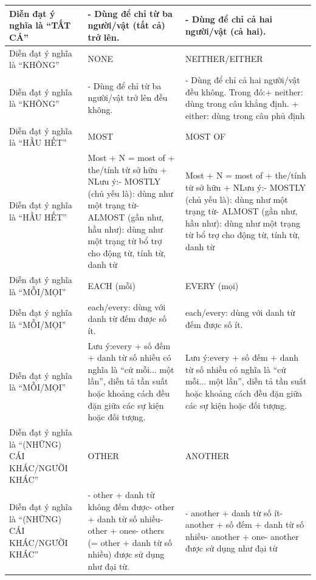 \documentclass[12pt,a4paper,twoside]{article}
\begin{document}
{\begin{longtable}{|>{\raggedright\arraybackslash}p{}|>{\raggedright\arraybackslash}p{}|>{\raggedright\arraybackslash}p{}|}
\hline
Diễn đạt ý nghĩa là “TẤT CẢ” & - Dùng để chỉ từ ba người/vật (tất cả) trở lên. & - Dùng để chỉ cả hai người/vật (cả hai). \\
\hline
Diễn đạt ý nghĩa là “KHÔNG” & NONE & NEITHER/EITHER \\
\hline
Diễn đạt ý nghĩa là “KHÔNG” & - Dùng để chỉ từ ba người/vật trở lên đều không. & - Dùng để chỉ cả hai người/vật đều không. Trong đó:\newline + neither: dùng trong câu khẳng định. + either: dùng trong câu phủ định \\
\hline
Diễn đạt ý nghĩa là “HẦU HẾT” & MOST & MOST OF \\
\hline
Diễn đạt ý nghĩa là “HẦU HẾT” & Most + N = most of + the/tính từ sở hữu + N\newline  Lưu ý:\newline - MOSTLY (chủ yếu là): dùng như một trạng từ\newline - ALMOST (gần như, hầu như): dùng như một trạng từ bổ trợ cho động từ, tính từ, danh từ & Most + N = most of + the/tính từ sở hữu + N\newline  Lưu ý:\newline - MOSTLY (chủ yếu là): dùng như một trạng từ\newline - ALMOST (gần như, hầu như): dùng như một trạng từ bổ trợ cho động từ, tính từ, danh từ \\
\hline
Diễn đạt ý nghĩa là “MỖI/MỌI” & EACH (mỗi) & EVERY (mọi) \\
\hline
Diễn đạt ý nghĩa là “MỖI/MỌI” & each/every: dùng với danh từ đếm được số ít. & each/every: dùng với danh từ đếm được số ít. \\
\hline
Diễn đạt ý nghĩa là “MỖI/MỌI” & Lưu ý:\newline every + số đếm + danh từ số nhiều có nghĩa là “cứ mỗi... một lần”, diễn tả tần suất hoặc khoảng cách đều đặn giữa các sự kiện hoặc đối tượng. & Lưu ý:\newline every + số đếm + danh từ số nhiều có nghĩa là “cứ mỗi... một lần”, diễn tả tần suất hoặc khoảng cách đều đặn giữa các sự kiện hoặc đối tượng. \\
\hline
Diễn đạt ý nghĩa là “(NHỮNG) CÁI KHÁC/NGƯỜI KHÁC” & OTHER & ANOTHER \\
\hline
Diễn đạt ý nghĩa là “(NHỮNG) CÁI KHÁC/NGƯỜI KHÁC” & - other + danh từ không đếm được\newline - other + danh từ số nhiều\newline - other + ones\newline - others (= other + danh từ số nhiều) được sử dụng như đại từ. & - another + danh từ số ít\newline - another + số đếm + danh từ số nhiều\newline - another + one\newline - another được sử dụng như đại từ \\

\end{longtable}}
\end{document}
